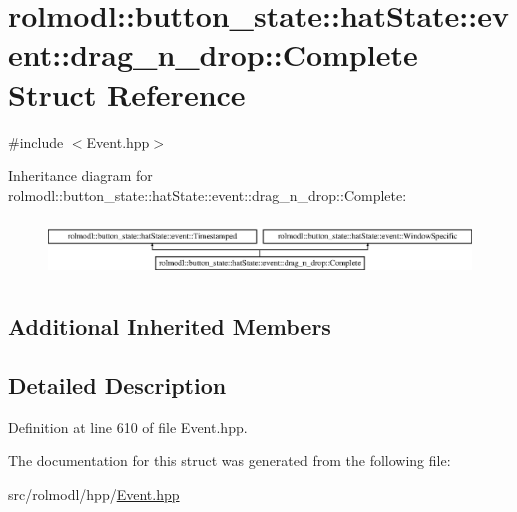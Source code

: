 \hypertarget{structrolmodl_1_1button__state_1_1hat_state_1_1event_1_1drag__n__drop_1_1_complete}{}\section{rolmodl\+::button\+\_\+state\+::hat\+State\+::event\+::drag\+\_\+n\+\_\+drop\+::Complete Struct Reference}
\label{structrolmodl_1_1button__state_1_1hat_state_1_1event_1_1drag__n__drop_1_1_complete}


{\ttfamily \#include $<$Event.\+hpp$>$}

Inheritance diagram for rolmodl\+::button\+\_\+state\+::hat\+State\+::event\+::drag\+\_\+n\+\_\+drop\+::Complete\+:\begin{figure}[H]
\begin{center}
\leavevmode
\includegraphics[height=1.559888cm]{structrolmodl_1_1button__state_1_1hat_state_1_1event_1_1drag__n__drop_1_1_complete}
\end{center}
\end{figure}
\subsection*{Additional Inherited Members}


\subsection{Detailed Description}


Definition at line 610 of file Event.\+hpp.



The documentation for this struct was generated from the following file\+:\begin{DoxyCompactItemize}
\item 
src/rolmodl/hpp/\mbox{\hyperlink{_event_8hpp}{Event.\+hpp}}\end{DoxyCompactItemize}
